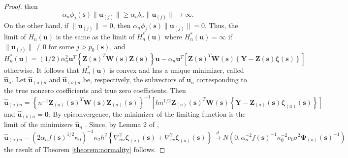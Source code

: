 \documentclass[authoryear,review, 12pt]{elsarticle}
\begin{document}
\begin{proof}
then 
\[
\alpha_{n}\phi_{j}(\bm{s})\|\bm{u}_{(j)}\|\ge\alpha_{n}b_{n}\|\bm{u}_{(j)}\|\to\infty.
\]
On the other hand, if $\|\bm{u}_{(j)}\|=0$, then $\alpha_{n}\phi_{j}(\bm{s})\|\bm{u}_{(j)}\|=0$.
Thus, the limit of $H_{n}(\bm{u})$ is the same as the limit of $H_{n}^{*}(\bm{u})$
where $H_{n}^{*}(\bm{u})=\infty$ if $\|\bm{u}_{(j)}\|\ne0$ for some
$j>p_{0}(\bm{s})$, and 
\[
H_{n}^{*}(\bm{u})=(1/2)\alpha_{n}^{2}\bm{u}^{T}\left\{ \bm{Z}(\bm{s})^{T}\bm{W}\!(\bm{s})\bm{Z}(\bm{s})\right\} \bm{u}-\alpha_{n}\bm{u}^{T}\left[\bm{Z}(\bm{s})^{T}\bm{W}\!(\bm{s})\left\{ \bm{Y}-\bm{Z}(\bm{s})\bm{\zeta}(\bm{s})\right\} \right]
\]
otherwise. It follows that $H_{n}^{*}(\bm{u})$ is convex and has
a unique minimizer, called $\hat{\bm{u}}_{n}$. Let $\hat{\bm{u}}_{(a)n}$
and $\hat{\bm{u}}_{(b)n}$ be, respectively, the subvectors of $\bm{u}_{n}$
corresponding to the true nonzero coefficients and true zero coefficients.
Then 
\[
\hat{\bm{u}}_{(a)n}=\left\{ n^{-1}\bm{Z}_{(a)}(\bm{s})^{T}\bm{W}\!(\bm{s})\bm{Z}_{(a)}(\bm{s})\right\} ^{-1}\left[hn^{1/2}\bm{Z}_{(a)}(\bm{s})^{T}\bm{W}\!(\bm{s})\left\{ \bm{Y}-\bm{Z}_{(a)}(\bm{s})\bm{\zeta}_{(a)}(\bm{s})\right\} \right]
\]
and $\hat{\bm{u}}_{(b)n}=\bm{0}.$ By epiconvergence, the minimizer
of the limiting function is the limit of the minimizers $\hat{\bm{u}}_{n}$
\citep{Geyer-1994,Knight-Fu-2000}. Since, by Lemma 2 of \citet{Sun-Yan-Zhang-Lu-2014},
\[
\hat{\bm{u}}_{(a)n}-\left(2\alpha_{n}f(\bm{s})^{1/2}\kappa_{0}\right)^{-1}\kappa_{2}h^{2}\left\{ \nabla_{uu}^{2}\bm{\zeta}_{(a)}(\bm{s})+\nabla_{vv}^{2}\bm{\zeta}_{(a)}(\bm{s})\right\} \xrightarrow{d}N\left(0,\alpha_{n}^{-2}f(\bm{s})^{-1}\kappa_{0}^{-2}\nu_{0}\sigma^{2}\bm{\Psi}_{(a)}(\bm{s})^{-1}\right)
\]
the result of Theorem \ref{theorem:normality} follows.
\end{proof}
\end{document}
